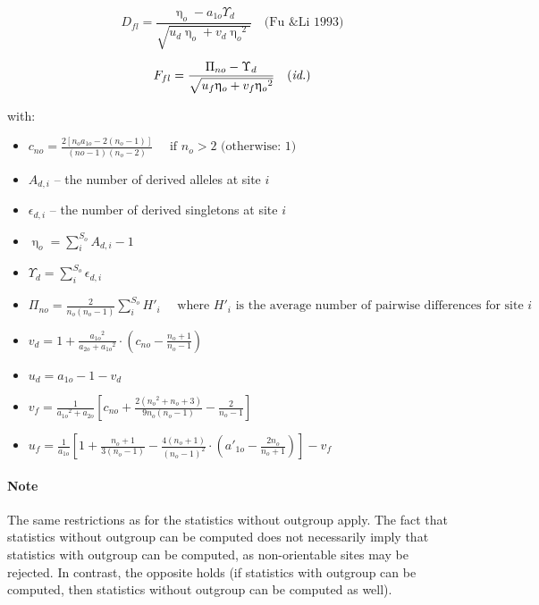 \documentclass{scrartcl}
\begin{document}
\begin{displaymath}
    D_{fl} = \frac{\upeta_o - a_{1o} \Upsilon_d} {\sqrt{u_d \upeta_o + v_d {\upeta_o}^2}} \quad \mbox{(Fu \& Li 1993)}
\end{displaymath}

\begin{displaymath}
    F_{fl} = \frac{\Pi_{no} - \Upsilon_d} {\sqrt{u_f \upeta_o + v_f {\upeta_o}^2}} \quad \mbox{(\textit{id.})}
\end{displaymath}

with:

\begin{itemize}
    \item[] $c_{no} = \frac{2[n_o a_{1o} - 2(n_o -1)]}{(no-1)(n_o-2)} \quad \mbox{ if } n_o > 2 \mbox{ (otherwise: 1)}$ 
    \item[] $A_{d,i}$ -- the number of derived alleles at site $i$
    \item[] $\epsilon_{d,i}$ -- the number of derived singletons at site $i$
    \item[] $\upeta_o = \sum_i^{S_o} A_{d,i} - 1$
    \item[] $\Upsilon_d = \sum_i^{S_o} \epsilon_{d,i}$
    \item[] $\Pi_{no} = \frac{2}{n_o(n_o-1)} \sum_i^{S_o} H'_i \quad \mbox{ where } H'_i \mbox{ is the average number of pairwise differences for site } i$
    \item[] $v_d = 1 + \frac{{a_{1o}}^2}{a_{2o}+{a_{1o}}^2} \cdot \left( c_{no} - \frac{n_o+1}{n_o-1} \right)$
    \item[] $u_d = a_{1o} - 1 - v_d$
    \item[] $v_f = \frac{1}{{a_{1o}}^2 + a_{2o}} \left[ c_{no} + \frac{2({n_o}^2+n_o+3)}{9n_o(n_o-1)} - \frac{2}{n_o-1} \right] $
    \item[] $u_f = \frac{1}{a_{1o}} \left[ 1 + \frac{n_o+1}{3(n_o-1)} - \frac{4(n_o+1)}{(n_o-1)^2} \cdot \left( a'_{1o} - \frac{2n_o}{n_o+1} \right) \right] - v_f$
\end{itemize}

\paragraph{Note} The same restrictions as for the statistics without
outgroup apply. The fact that statistics without outgroup can be
computed does not necessarily imply that statistics with outgroup can be
computed, as non-orientable sites may be rejected. In contrast, the
opposite holds (if statistics with outgroup can be computed, then
statistics without outgroup can be computed as well).
\end{document}
